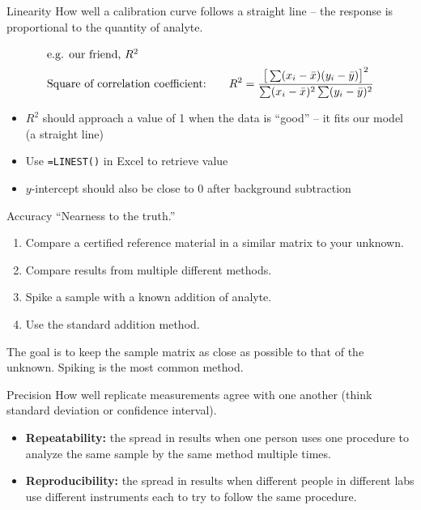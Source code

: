 \documentclass[notes=show]{beamer}
\begin{document}
\begin{frame}{Linearity}
	How well a calibration curve follows a straight line -- the response is
	\alert{proportional} to the quantity of analyte.

	\begin{align*}
		\shortintertext{e.g. our friend, $R^2$}
		\text{Square of correlation coefficient:\qquad} R^2 =
		\dfrac{\big[\sum(x_i - \bar{x})(y_i - \bar{y})\big]^2}{\sum (x_i
		- \bar{x})^2 \sum (y_i - \bar{y})^2}
	\end{align*}

	\begin{itemize}
		\item $R^2$ should approach a value of 1 when the data is
			``good'' -- it fits our model (a straight line)
		\item Use \texttt{=LINEST()} in Excel to retrieve value
		\item $y$-intercept should also be close to 0 \alert{after
			background subtraction}
	\end{itemize}
\end{frame}

\begin{frame}{Accuracy}
	``Nearness to the truth.''

	\begin{enumerate}
		\item Compare a \alert{certified reference material} in a
			similar matrix to your unknown.
		\item Compare results from multiple different methods.
		\item Spike a sample with a known addition of analyte.
		\item Use the \alert{standard addition} method.
	\end{enumerate}

	The goal is to keep the sample matrix as close as possible to that of
	the unknown. Spiking is the most common method.
\end{frame}

\begin{frame}{Precision}
	How well replicate measurements agree with one another (think standard
	deviation or confidence interval).

	\begin{itemize}
		\item \textbf{Repeatability:} the spread in results when
			\alert{one} person uses \alert{one} procedure to analyze
			the \alert{same} sample by the \alert{same} method
			multiple times.
		\item \textbf{Reproducibility:} the spread in results when
			\alert{different} people in \alert{different} labs use
			\alert{different} instruments each to try to follow the
			\alert{same} procedure.
	\end{itemize}
\end{frame}
\end{document}
